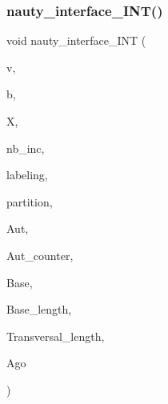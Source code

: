 \subsubsection{\texorpdfstring{nauty\+\_\+interface\+\_\+\+I\+N\+T()}{nauty\_interface\_INT()}}
{\footnotesize\ttfamily void nauty\+\_\+interface\+\_\+\+I\+NT (\begin{DoxyParamCaption}\item[{\mbox{\hyperlink{galois_8h_a09fddde158a3a20bd2dcadb609de11dc}{I\+NT}}}]{v,  }\item[{\mbox{\hyperlink{galois_8h_a09fddde158a3a20bd2dcadb609de11dc}{I\+NT}}}]{b,  }\item[{\mbox{\hyperlink{galois_8h_a09fddde158a3a20bd2dcadb609de11dc}{I\+NT}} $\ast$}]{X,  }\item[{\mbox{\hyperlink{galois_8h_a09fddde158a3a20bd2dcadb609de11dc}{I\+NT}}}]{nb\+\_\+inc,  }\item[{\mbox{\hyperlink{galois_8h_a09fddde158a3a20bd2dcadb609de11dc}{I\+NT}} $\ast$}]{labeling,  }\item[{\mbox{\hyperlink{galois_8h_a09fddde158a3a20bd2dcadb609de11dc}{I\+NT}} $\ast$}]{partition,  }\item[{\mbox{\hyperlink{galois_8h_a09fddde158a3a20bd2dcadb609de11dc}{I\+NT}} $\ast$}]{Aut,  }\item[{\mbox{\hyperlink{galois_8h_a09fddde158a3a20bd2dcadb609de11dc}{I\+NT}} \&}]{Aut\+\_\+counter,  }\item[{\mbox{\hyperlink{galois_8h_a09fddde158a3a20bd2dcadb609de11dc}{I\+NT}} $\ast$}]{Base,  }\item[{\mbox{\hyperlink{galois_8h_a09fddde158a3a20bd2dcadb609de11dc}{I\+NT}} \&}]{Base\+\_\+length,  }\item[{\mbox{\hyperlink{galois_8h_a09fddde158a3a20bd2dcadb609de11dc}{I\+NT}} $\ast$}]{Transversal\+\_\+length,  }\item[{\mbox{\hyperlink{galois_8h_a09fddde158a3a20bd2dcadb609de11dc}{I\+NT}} \&}]{Ago }\end{DoxyParamCaption})}

\mbox{\label{nauty__interface_8_c_a35249697a242e279194d6e2ad972f765}} 

